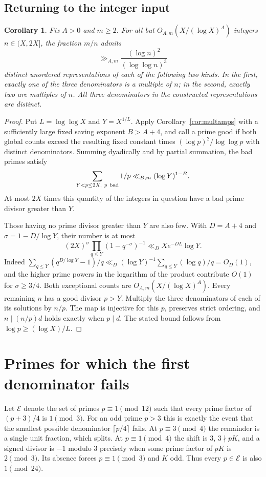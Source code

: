 \documentclass[a4paper,11pt]{article}
\newtheorem{corollary}[theorem]{Corollary}
\begin{document}
\subsection{Returning to the integer input}
\begin{corollary}\label{cor:integer}
Fix $A>0$ and $m\ge2$. For all but $O_{A,m}(X/(\log X)^A)$ integers $n\in(X,2X]$, the fraction $m/n$ admits
\[
 \gg_{A,m}\frac{(\log n)^2}{(\log\log n)^3}
\]
distinct unordered representations of each of the following two kinds. In the first, exactly one of the three denominators is a multiple of $n$; in the second, exactly two are multiples of $n$. All three denominators in the constructed representations are distinct.
\end{corollary}
\begin{proof}
Put $L=\log\log X$ and $Y=X^{1/L}$. Apply Corollary~\ref{cor:multamps} with a sufficiently large fixed saving exponent $B>A+4$, and call a prime good if both global counts exceed the resulting fixed constant times $(\log p)^2/\log\log p$ with distinct denominators. Summing dyadically and by partial summation, the bad primes satisfy
\[
 \sum_{Y<p\le2X,\ p\ {\rm bad}}1/p\ll_{B,m}(\log Y)^{1-B}.
\]
At most $2X$ times this quantity of the integers in question have a bad prime divisor greater than $Y$.

Those having no prime divisor greater than $Y$ are also few. With $D=A+4$ and $\sigma=1-D/\log Y$, their number is at most
\[
 (2X)^\sigma\prod_{q\le Y}(1-q^{-\sigma})^{-1}
 \ll_D X e^{-D L}\log Y .
\]
Indeed $\sum_{q\le Y}(q^{D/\log Y}-1)/q\ll_D (\log Y)^{-1}\sum_{q\le Y}(\log q)/q=O_D(1)$, and the higher prime powers in the logarithm of the product contribute $O(1)$ for $\sigma\ge3/4$. Both exceptional counts are $O_{A,m}(X/(\log X)^A)$. Every remaining $n$ has a good divisor $p>Y$. Multiply the three denominators of each of its solutions by $n/p$. The map is injective for this $p$, preserves strict ordering, and $n\mid(n/p)d$ holds exactly when $p\mid d$. The stated bound follows from $\log p\ge(\log X)/L$.
\end{proof}


\section{Primes for which the first denominator fails}\label{sec:thin}
Let $\mathcal E$ denote the set of primes $p\equiv1\pmod{12}$ such that every prime factor of $(p+3)/4$ is $1\pmod3$. For an odd prime $p>3$ this is exactly the event that the smallest possible denominator $\lceil p/4\rceil$ fails. At $p\equiv3\pmod4$ the remainder is a single unit fraction, which splits. At $p\equiv1\pmod4$ the shift is $3$, $3\nmid pK$, and a signed divisor is $-1$ modulo $3$ precisely when some prime factor of $pK$ is $2\pmod3$. Its absence forces $p\equiv1\pmod3$ and $K$ odd. Thus every $p\in\mathcal E$ is also $1\pmod{24}$.
\end{document}
